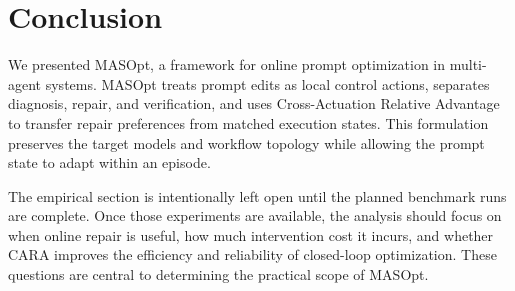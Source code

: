 \section{Conclusion}
\label{sec:conclusion}

We presented MASOpt, a framework for online prompt optimization in multi-agent systems. MASOpt treats prompt edits as local control actions, separates diagnosis, repair, and verification, and uses Cross-Actuation Relative Advantage to transfer repair preferences from matched execution states. This formulation preserves the target models and workflow topology while allowing the prompt state to adapt within an episode.

The empirical section is intentionally left open until the planned benchmark runs are complete. Once those experiments are available, the analysis should focus on when online repair is useful, how much intervention cost it incurs, and whether CARA improves the efficiency and reliability of closed-loop optimization. These questions are central to determining the practical scope of MASOpt.
